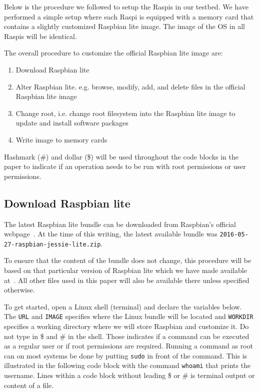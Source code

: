Below is the procedure we followed to setup the \ac{Raspi}s in our testbed. We
have performed a simple setup where each \ac{Raspi} is equipped with a
memory card that contains a slightly customized Raspbian lite image. The image
of the \ac{OS} in all \ac{Raspi}s will be identical.

The overall procedure to customize the official Raspbian lite image
are:
\begin{enumerate}
    \item Download Raspbian lite
    \item Alter Raspbian lite. e.g. browse, modify, add, and delete files
        in the official Raspbian lite image
    \item Change root, i.e. change root filesystem into the Raspbian lite
        image to update and install software packages
    \item Write image to memory cards
\end{enumerate}

Hashmark (\#) and dollar (\$) will be used throughout the code blocks in
the paper to indicate if an operation needs to be run with root permissions or
user permissions.

\subsection{Download Raspbian lite}

The latest Raspbian lite bundle can be downloaded from Raspbian's official
webpage~\cite{raspbian}.
At the time of this writing, the latest available bundle was
\texttt{2016-05-27-raspbian-jessie-lite.zip}.

To ensure that the content of the bundle does not change, this procedure
will be based on that particular version of Raspbian lite which we have
made available at~\cite{tunescode_webpage}. All other files used in this paper
will also be available there unless specified otherwise.


To get started, open a Linux shell (terminal) and declare the variables below.
The \texttt{URL} and \texttt{IMAGE} specifies where the Linux bundle will be
located and \texttt{WORKDIR} specifies a working directory where we will 
store Raspbian and customize it.
Do not type in \$ and \# in the shell. Those indicates if a command can be
executed as a regular user or if root permissions are required.
Running a command as root can on most systems be done by putting
\texttt{sudo} in front of the command. This is illustrated in the
following code block 
with the command \texttt{whoami} that prints the username. Lines within a code
block without leading \$ or \# is terminal output or content of a file.

